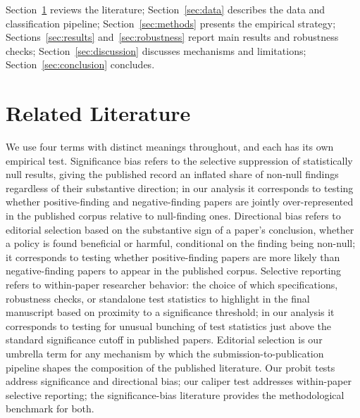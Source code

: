 \documentclass[12pt]{article}
\begin{document}
Section~\ref{sec:literature} reviews the literature; Section~\ref{sec:data}
describes the data and classification pipeline;
Section~\ref{sec:methods} presents the empirical strategy;
Sections~\ref{sec:results} and~\ref{sec:robustness} report main results
and robustness checks; Section~\ref{sec:discussion} discusses
mechanisms and limitations; Section~\ref{sec:conclusion} concludes.

\section{Related Literature}
\label{sec:literature}

We use four terms with distinct meanings throughout, and each has its
own empirical test.
Significance bias refers to the selective suppression of
statistically null results, giving the published record an inflated
share of non-null findings regardless of their substantive direction; in
our analysis it corresponds to testing whether positive-finding and
negative-finding papers are jointly over-represented in the published
corpus relative to null-finding ones.
Directional bias refers to editorial selection based on the
substantive sign of a paper's conclusion, whether a policy is found
beneficial or harmful, conditional on the finding being non-null; it
corresponds to testing whether positive-finding papers are more
likely than negative-finding papers to appear in the published
corpus.
Selective reporting refers to within-paper researcher behavior:
the choice of which specifications, robustness checks, or standalone
test statistics to highlight in the final manuscript based on
proximity to a significance threshold; in our analysis it
corresponds to testing for unusual bunching of test statistics just
above the standard significance cutoff in published papers.
Editorial selection is our umbrella term for any mechanism by
which the submission-to-publication pipeline shapes the composition of
the published literature.
Our probit tests address significance and directional bias; our
caliper test addresses within-paper selective reporting; the
significance-bias literature provides the methodological benchmark
for both.
\end{document}
